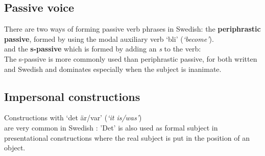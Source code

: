 \documentclass{report}
\begin{document}
\subsection*{Passive voice}
There are two ways of forming passive verb phrases in Swedish: the 
\textbf{periphrastic passive}, formed by using the modal auxiliary verb `bli' (\emph{`become'}).\\
\label{gfPass:peri-pass}
and the \textbf{s-passive} which is formed by adding an \emph{s} to the verb: \\
\label{gfPass:s-pass}
The s-passive is more commonly used than periphrastic passive, for both written
and Swedish \cite[Pass. ]{SAG} and dominates especially when the subject is inanimate.

\subsection*{Impersonal constructions}
Constructions with `det är/var' (\emph{`it is/was'}) \\are very common in Swedish
\cite[\textsection 309d]{H&H}:
'Det' %
is also used as formal subject in presentational constructions where
the real subject is put in the position of an object.
\end{document}
